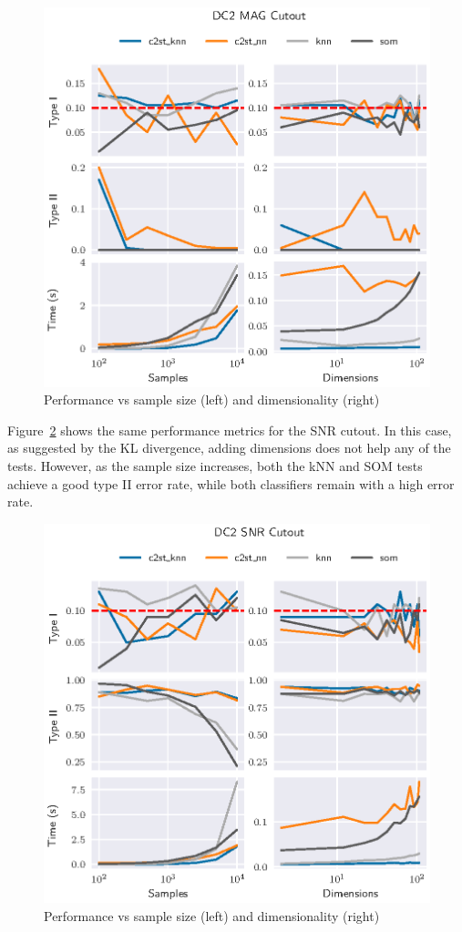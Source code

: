 \begin{figure}[htpb]
    \centering
    \includegraphics{images/4_som/dc2_mag}
    \caption{Performance vs sample size (left) and dimensionality (right)}
    \label{fig:dc2_mag}
\end{figure}

Figure~\ref{fig:dc2_snr} shows the same performance metrics for the SNR cutout. In this case,
as suggested by the KL divergence, adding dimensions does not help any of the tests.
However, as the sample size increases, both the kNN and \gls{SOM}  tests achieve a good type II error rate,
while both classifiers remain with a high error rate.

\begin{figure}[htbp]
    \centering
    \includegraphics{images/4_som/dc2_snr}
    \caption{Performance vs sample size (left) and dimensionality (right)}
    \label{fig:dc2_snr}
\end{figure}

